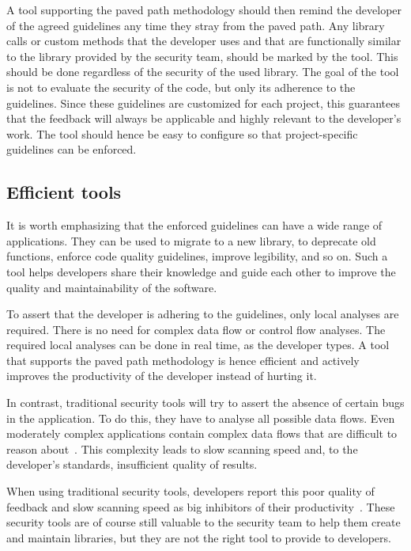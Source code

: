 A tool supporting the paved path methodology should then remind the developer of the agreed guidelines any time they stray from the paved path.
Any library calls or custom methods that the developer uses and that are functionally similar to the library provided by the security team, should be marked by the tool.
This should be done regardless of the security of the used library. The goal of the tool is not to evaluate the security of the code, but only its adherence to the guidelines.
Since these guidelines are customized for each project, this guarantees that the feedback will always be applicable and highly relevant to the developer's work.
The tool should hence be easy to configure so that project-specific guidelines can be enforced.

\subsection{Efficient tools}
It is worth emphasizing that the enforced guidelines can have a wide range of applications. They can be used to migrate to a new library, to deprecate old functions, enforce code quality guidelines, improve legibility, and so on. 
Such a tool helps developers share their knowledge and guide each other to improve the quality and maintainability of the software. 

To assert that the developer is adhering to the guidelines, only local analyses are required. There is no need for complex data flow or control flow analyses. The required local analyses can be done in real time, as the developer types. 
A tool that supports the paved path methodology is hence efficient and actively improves the productivity of the developer instead of hurting it.

In contrast, traditional security tools will try to assert the absence of certain bugs in the application. To do this, they have to analyse all possible data flows. Even moderately complex applications contain complex data flows that are difficult to reason about~\cite{kern2014securing}. This complexity leads to slow scanning speed and, to the developer's standards, insufficient quality of results. 

When using traditional security tools, developers report this poor quality of feedback and slow scanning speed as big inhibitors of their productivity~\cite{shiftleftsurvey}.
These security tools are of course still valuable to the security team to help them create and maintain libraries, but they are not the right tool to provide to developers.

